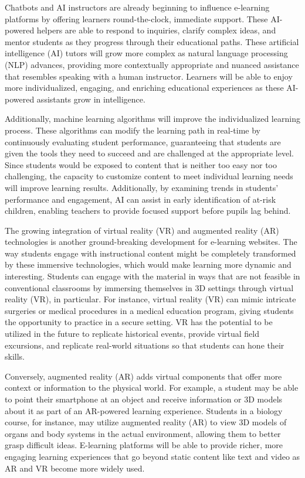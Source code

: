 \documentclass[BTech]{audiss}
\begin{document}
Chatbots and AI instructors are already beginning to influence e-learning platforms by offering learners round-the-clock, immediate support. These AI-powered helpers are able to respond to inquiries, clarify complex ideas, and mentor students as they progress through their educational paths. These artificial intelligence (AI) tutors will grow more complex as natural language processing (NLP) advances, providing more contextually appropriate and nuanced assistance that resembles speaking with a human instructor. Learners will be able to enjoy more individualized, engaging, and enriching educational experiences as these AI-powered assistants grow in intelligence.

Additionally, machine learning algorithms will improve the individualized learning process. These algorithms can modify the learning path in real-time by continuously evaluating student performance, guaranteeing that students are given the tools they need to succeed and are challenged at the appropriate level. Since students would be exposed to content that is neither too easy nor too challenging, the capacity to customize content to meet individual learning needs will improve learning results. Additionally, by examining trends in students' performance and engagement, AI can assist in early identification of at-risk children, enabling teachers to provide focused support before pupils lag behind.

The growing integration of virtual reality (VR) and augmented reality (AR) technologies is another ground-breaking development for e-learning websites. The way students engage with instructional content might be completely transformed by these immersive technologies, which would make learning more dynamic and interesting. Students can engage with the material in ways that are not feasible in conventional classrooms by immersing themselves in 3D settings through virtual reality (VR), in particular. For instance, virtual reality (VR) can mimic intricate surgeries or medical procedures in a medical education program, giving students the opportunity to practice in a secure setting. VR has the potential to be utilized in the future to replicate historical events, provide virtual field excursions, and replicate real-world situations so that students can hone their skills.

Conversely, augmented reality (AR) adds virtual components that offer more context or information to the physical world. For example, a student may be able to point their smartphone at an object and receive information or 3D models about it as part of an AR-powered learning experience. Students in a biology course, for instance, may utilize augmented reality (AR) to view 3D models of organs and body systems in the actual environment, allowing them to better grasp difficult ideas. E-learning platforms will be able to provide richer, more engaging learning experiences that go beyond static content like text and video as AR and VR become more widely used.
\end{document}
